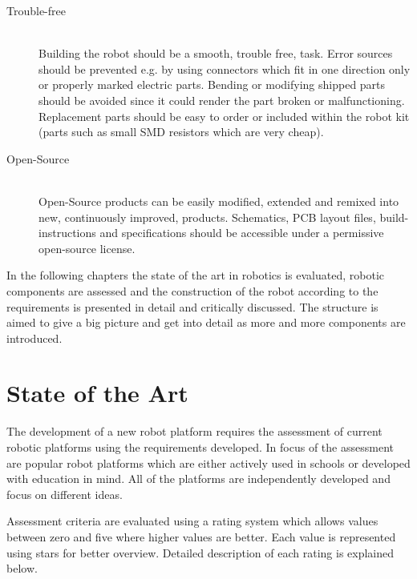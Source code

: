 \documentclass[11pt,a4paper]{article}
\begin{document}
\begin{description}
\item[Trouble-free] \hfill \\ Building the robot should be a smooth, trouble free, task. Error sources should be prevented e.g. by using connectors which fit in one direction only or properly marked electric parts. Bending or modifying shipped parts should be avoided since it  could render the part broken or malfunctioning. Replacement parts should be easy to order or included within the robot kit (parts such as small SMD resistors which are very cheap).
\item[Open-Source] \hfill \\ Open-Source products can be easily modified, extended and remixed into new, continuously improved, products. Schematics, PCB layout files, build-instructions and specifications should be accessible under a permissive open-source license. 
\end{description}

In the following chapters the state of the art in robotics is evaluated, robotic components are assessed and the construction of the robot according to the requirements is presented in detail and critically discussed. The structure is aimed to give a big picture and get into detail as more and more components are introduced.
\section{State of the Art}
The development of a new robot platform requires the assessment of current robotic platforms using the requirements developed. In focus of the assessment are popular robot platforms which are either actively used in schools or developed with education in mind. All of the platforms are independently developed and focus on different ideas. 

Assessment criteria are evaluated using a rating system which allows values between zero and five where higher values are better. Each value is represented using stars for better overview. Detailed description of each rating is explained below.
\end{document}
